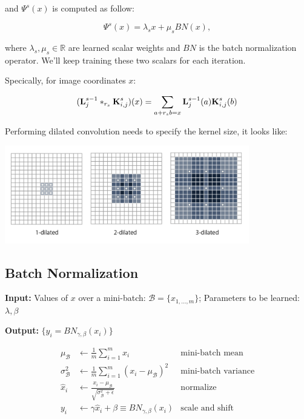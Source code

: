 \documentclass{article}
\newcommand{\tb}{\textbf}
\begin{document}
and $\Psi^s(x)$ is computed as follow:

$$\Psi^s(x) = \lambda_s x + \mu_s BN(x),$$

where $\lambda_s, \mu_s \in \mathbb R$ are learned scalar weights and $BN$ is the batch normalization operator. We'll keep training these two scalars for each iteration.

Specically, for image coordinates $x$:

$$(\textbf L_j^{s - 1} *_{r_s} \textbf K_{i,j}^s) (x) = \sum\limits_{a + r_s b = x} \textbf L_j^{s - 1}(a) \textbf K_{i,j}^s(b)$$

Performing dilated convolution needs to specify the kernel size, it looks like: \\

\begin{center}
\includegraphics[width=0.8\textwidth]{img/dilated.png}
\end{center}

\subsection*{Batch Normalization}

\tb{Input:} Values of $x$ over a mini-batch: $\mathcal B = \{x_{1, \dots, m}\}$; Parameters to be learned: $\lambda, \beta$

\tb{Output:} $\{y_i = BN_{\gamma, \beta}(x_i)\}$

\begin{align*}
\mu_{\mathcal B}      & \leftarrow \frac{1}{m} \sum_{i = 1}^m x_i                                         & \text{mini-batch mean} \\
\sigma_{\mathcal B}^2 & \leftarrow \frac{1}{m} \sum_{i = 1}^m (x_i - \mu_{\mathcal B})^2                  & \text{mini-batch variance} \\
\hat x_i              & \leftarrow \frac{x_i - \mu_{\mathcal B}}{\sqrt{\sigma_{\mathcal B}^2 + \epsilon}} & \text{normalize} \\
y_i                   & \leftarrow \gamma \hat x_i + \beta \equiv BN_{\gamma, \beta}(x_i)                            & \text{scale and shift}
\end{align*}
\end{document}
